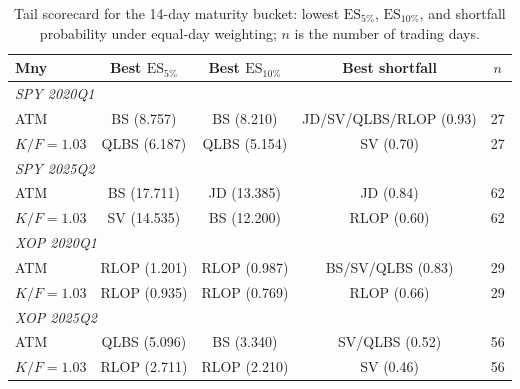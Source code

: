 \begin{table}[t]
\centering
\footnotesize
\setlength{\tabcolsep}{3.5pt}
\renewcommand{\arraystretch}{0.98}
\begin{tabular}{lcccc}
\toprule
Mny & Best $\mathrm{ES}_{5\%}$ & Best $\mathrm{ES}_{10\%}$ & Best shortfall & $n$ \\
\midrule
\multicolumn{5}{l}{\textit{SPY 2020Q1}} \\
ATM        & BS (8.757)    & BS (8.210)    & JD/SV/QLBS/RLOP (0.93) & 27 \\
$K/F=1.03$ & QLBS (6.187)  & QLBS (5.154)  & SV (0.70)              & 27 \\
\midrule
\multicolumn{5}{l}{\textit{SPY 2025Q2}} \\
ATM        & BS (17.711)   & JD (13.385)   & JD (0.84)              & 62 \\
$K/F=1.03$ & SV (14.535)   & BS (12.200)   & RLOP (0.60)            & 62 \\
\midrule
\multicolumn{5}{l}{\textit{XOP 2020Q1}} \\
ATM        & RLOP (1.201)  & RLOP (0.987)  & BS/SV/QLBS (0.83)      & 29 \\
$K/F=1.03$ & RLOP (0.935)  & RLOP (0.769)  & RLOP (0.66)            & 29 \\
\midrule
\multicolumn{5}{l}{\textit{XOP 2025Q2}} \\
ATM        & QLBS (5.096)  & BS (3.340)    & SV/QLBS (0.52)         & 56 \\
$K/F=1.03$ & RLOP (2.711)  & RLOP (2.210)  & SV (0.46)              & 56 \\
\bottomrule
\end{tabular}
\caption{Tail scorecard for the 14-day maturity bucket: lowest $\mathrm{ES}_{5\%}$, $\mathrm{ES}_{10\%}$, and shortfall probability under equal-day weighting; $n$ is the number of trading days.}
\label{tab:scorecard_14d}
\end{table}


